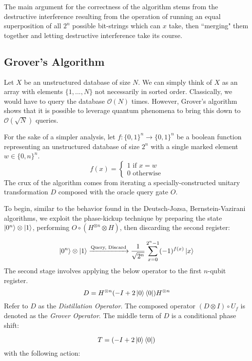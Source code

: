 The main argument for the correctness of the algorithm stems from the destructive interference resulting from the operation of running an equal superposition of all $2^n$ possible bit-strings which can $x$ take, then ``merging" them together and letting destructive interference take its course.


\subsection{Grover's Algorithm}

Let $X$ be an unstructured database of size $N$. We can simply think of $X$ as an array with elements $\{1,...,N\}$ not necessarily in sorted order. Classically, we would have to query the database $\mathcal{O}(N)$ times. However, Grover's algorithm shows that it is possible to leverage quantum phenomena to bring this down to $\mathcal{O}(\sqrt{N})$ queries.

For the sake of a simpler analysis, let $f:\{0,1\}^n \rightarrow \{0,1\}^n$ be a boolean function representing an unstructured database of size $2^n$ with a single marked element $w \in \{0,n\}^n$.
$$ f(x) = \begin{cases}
            1 \text{ if } x = w \\
            0 \text{ otherwise}
          \end{cases} $$
The crux of the algorithm comes from iterating a specially-constructed unitary transformation $D$ composed with the oracle query gate $O$.

To begin, similar to the behavior found in the Deutsch-Jozsa, Bernstein-Vazirani algorithms, we exploit the phase-kickup technique by preparing the state $\ket{0^n} \otimes \ket{1}$, performing $O \circ(H^{\otimes n} \otimes H)$, then discarding the second register:

\begin{equation}\label{GrovOpAction}
\ket{0^n} \otimes \ket{1} \xrightarrow{\text{Query, Discard}} \frac{1}{\sqrt{2^n}} \sum_{x=0}^{2^n-1} (-1)^{f(x)} \ket{x}
\end{equation}
%
The second stage involves applying the below operator to the first $n$-qubit register.
%
$$ D = H^{\otimes n}(-I + 2\ket{0}\bra{0})H^{\otimes n} $$
%
Refer to $D$ as the \emph{Distillation Operator}. The composed operator $(D \otimes I) \circ U_f$ is denoted as the \emph{Grover Operator}. The middle term of $D$ is a conditional phase shift:

\[ T = (-I + 2\ket{0}\bra{0})\] with the following action:

